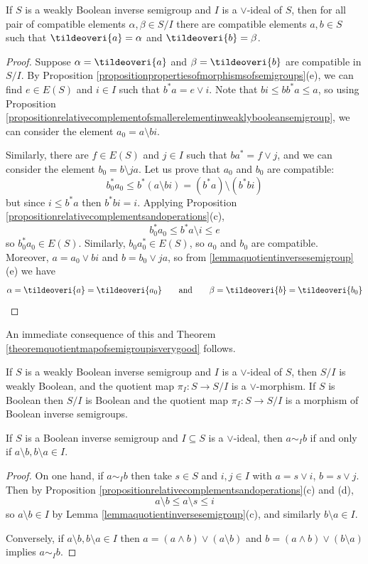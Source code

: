 \begin{theorem}\label{theoremcompatibleinquotientareimageofcompatible}
If $S$ is a weakly Boolean inverse semigroup and $I$ is a $\lor$-ideal of $S$, then for all pair of compatible elements $\alpha,\beta\in S/I$ there are compatible elements $a,b\in S$ such that $\tildeoveri{a}=\alpha$ and $\tildeoveri{b}=\beta$.
\end{theorem}
\begin{proof}
Suppose $\alpha=\tildeoveri{a}$ and $\beta=\tildeoveri{b}$ are compatible in $S/I$. By Proposition \ref{propositionpropertiesofmorphismsofsemigroups}(e), we can find $e\in E(S)$ and $i\in I$ such that $b^*a=e\lor i$. Note that $bi\leq bb^*a\leq a$, so using Proposition \ref{propositionrelativecomplementofsmallerelementinweaklybooleansemigroup}, we can consider the element $a_0=a\setminus bi$.

Similarly, there are $f\in E(S)$ and $j\in I$ such that $ba^*=f\lor j$, and we can consider the element $b_0=b\setminus ja$. Let us prove that $a_0$ and $b_0$ are compatible:
\[b_0^*a_0\leq b^*(a\setminus bi)=(b^*a)\setminus(b^*b i)\]
but since $i\leq b^*a$ then $b^*bi=i$. Applying Proposition \ref{propositionrelativecomplementsandoperations}(c),
\[b_0^*a_0\leq b^*a\setminus i\leq e\]
so $b_0^*a_0\in E(S)$. Similarly, $b_0 a_0^*\in E(S)$, so $a_0$ and $b_0$ are compatible. Moreover, $a=a_0\lor bi$ and $b=b_0\lor ja$, so from \ref{lemmaquotientinversesemigroup}(e) we have
\[\alpha=\tildeoveri{a}=\tildeoveri{a_0}\qquad\text{and}\qquad\beta=\tildeoveri{b}=\tildeoveri{b_0}\qedhere\]
\end{proof}
An immediate consequence of this and Theorem \ref{theoremquotientmapofsemigroupisverygood} follows.

\begin{theorem}\label{theoremquotientofbooleanisboolean}
If $S$ is a weakly Boolean inverse semigroup and $I$ is a $\lor$-ideal of $S$, then $S/I$ is weakly Boolean, and the quotient map $\pi_I:S\to S/I$ is a $\lor$-morphism. If $S$ is Boolean then $S/I$ is Boolean and the quotient map $\pi_I:S\to S/I$ is a morphism of Boolean inverse semigroups.
\end{theorem}

\begin{proposition}\label{propositionquotientrelationofbooleansemigroup}
If $S$ is a Boolean inverse semigroup and $I\subseteq S$ is a $\lor$-ideal, then $a\sim_I b$ if and only if $a\setminus b,b\setminus a\in I$.
\end{proposition}
\begin{proof}
On one hand, if $a\sim_I b$ then take $s\in S$ and $i,j\in I$ with $a=s\lor i$, $b=s\lor j$. Then by Proposition \ref{propositionrelativecomplementsandoperations}(c) and (d),
\[a\setminus b\leq a\setminus s\leq i\]
so $a\setminus b\in I$ by Lemma \ref{lemmaquotientinversesemigroup}(c), and similarly $b\setminus a\in I$.

Conversely, if $a\setminus b,b\setminus a\in I$ then $a=(a\land b)\lor(a\setminus b)$ and $b=(a\land b)\lor(b\setminus a)$ implies $a\sim_I b$.\qedhere
\end{proof}

